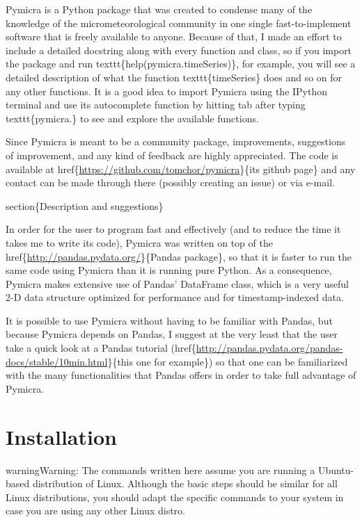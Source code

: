 \documentclass[a4paper,10pt,english]{sphinxmanual}
\begin{document}
Pymicra is a Python package that was created to condense many of the knowledge
of the micrometeorological community in one single fast-to-implement software
that is freely available to anyone. Because of that, I made an effort to include
a detailed docstring along with every function and class, so if you import the
package and run texttt\{help(pymicra.timeSeries)\}, for example, you will see a
detailed description of what the function texttt\{timeSeries\} does and so on for
any other functions. It is a good idea to import Pymicra using the IPython
terminal and use its autocomplete function by hitting tab after typing
texttt\{pymicra.\} to see and explore the available functions.

Since Pymicra is meant to be a community package, improvements, suggestions of
improvement, and any kind of feedback are highly appreciated. The code is
available at href\{\url{https://github.com/tomchor/pymicra}\}\{its github page\} and any
contact can be made through there (possibly creating an issue) or via e-mail.

section\{Description and suggestions\}

In order for the user to program fast and effectively (and to reduce the time it
takes me to write its code), Pymicra was written on top of the
href\{\url{http://pandas.pydata.org/}\}\{Pandas package\}, so that it is faster to run
the same code using Pymicra than it is running pure Python. As a consequence,
Pymicra makes extensive use of Pandas' DataFrame class, which is a very useful
2-D data structure optimized for performance and for timestamp-indexed data.

It is possible to use Pymicra without having to be familiar with Pandas, but
because Pymicra depends on Pandas, I suggest at the very least that the user
take a quick look at a Pandas tutorial
(href\{\url{http://pandas.pydata.org/pandas-docs/stable/10min.html}\}\{this one for
example\}) so that one can be familiarized with the many functionalities that
Pandas offers in order to take full advantage of Pymicra.


\section{Installation}
\label{install:installation}\label{install::doc}
\begin{notice}{warning}{Warning:}
The commands written here assume you are running a Ubuntu-based distribution of
Linux. Although the basic steps should be similar for all Linux distributions, you
should adapt the specific commands to your system in case you are using any other Linux distro.
\end{notice}
\end{document}
